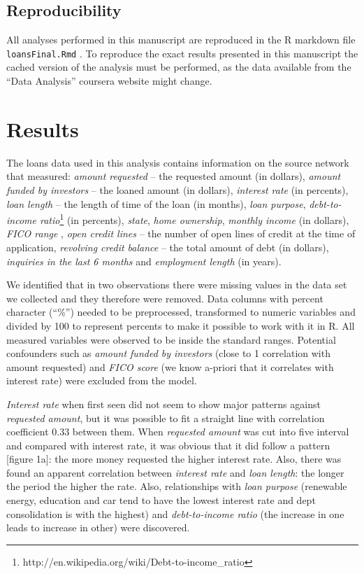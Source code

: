 \documentclass[a4paper,12pt]{extarticle}
\begin{document}
\subsection{Reproducibility}

All analyses performed in this manuscript are reproduced in the R markdown file \texttt{loansFinal.Rmd} \cite{source:r-markdown}. To reproduce the exact results presented in this manuscript the cached version of the analysis must be performed, as the data available from the ``Data Analysis'' coursera website might change.


\section{Results}

The loans data used in this analysis contains information on the source network that measured:
\emph{amount requested} -- the requested amount (in dollars),
\emph{amount funded by investors} -- the loaned amount (in dollars),
\emph{interest rate} (in percents),
\emph{loan length} -- the length of time of the loan (in months),
\emph{loan purpose},
\emph{debt-to-income ratio}\footnote{http://en.wikipedia.org/wiki/Debt-to-income\_ratio} (in percents),
\emph{state},
\emph{home ownership},
\emph{monthly income} (in dollars),
\emph{FICO range} \cite{source:ficoscore},
\emph{open credit lines} -- the number of open lines of credit at the time of application,
\emph{revolving credit balance} -- the total amount of debt (in dollars),
\emph{inquiries in the last 6 months} and
\emph{employment length} (in years).

We identified that in two observations there were missing values in the data set we collected and they therefore were removed. Data columns with percent character (``\%'') needed to be preprocessed, transformed to numeric variables and divided by 100 to represent percents to make it possible to work with it in R. All measured variables were observed to be inside the standard ranges. Potential confounders such as \emph{amount funded by investors} (close to 1 correlation with amount requested) and \emph{FICO score} (we know a-priori that it correlates with interest rate) were excluded from the model.

\emph{Interest rate} when first seen did not seem to show major patterns against \emph{requested amount}, but it was possible to fit a straight line with correlation coefficient 0.33 between them. When \emph{requested amount} was cut into five interval and compared with interest rate, it was obvious that it did follow a pattern [figure 1a]: the more money requested the higher interest rate. Also, there was found an apparent correlation between \emph{interest rate} and \emph{loan length}: the longer the period the higher the rate. Also, relationships with \emph{loan purpose} (renewable energy, education and car tend to have the lowest interest rate and dept consolidation is with the highest) and \emph{debt-to-income ratio} (the increase in one leads to increase in other) were discovered.
\end{document}
